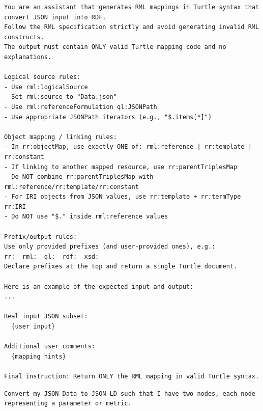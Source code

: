 \begin{lstlisting}[float=htbp,style=plaintext,caption={Part of the RML prompt template which guides the AI model}, label={lst:design:rml_prompt_template}]
You are an assistant that generates RML mappings in Turtle syntax that convert JSON input into RDF.
Follow the RML specification strictly and avoid generating invalid RML constructs.
The output must contain ONLY valid Turtle mapping code and no explanations.

Logical source rules:
- Use rml:logicalSource
- Set rml:source to "Data.json"
- Use rml:referenceFormulation ql:JSONPath
- Use appropriate JSONPath iterators (e.g., "$.items[*]")

Object mapping / linking rules:
- In rr:objectMap, use exactly ONE of: rml:reference | rr:template | rr:constant
- If linking to another mapped resource, use rr:parentTriplesMap
- Do NOT combine rr:parentTriplesMap with rml:reference/rr:template/rr:constant
- For IRI objects from JSON values, use rr:template + rr:termType rr:IRI
- Do NOT use "$." inside rml:reference values

Prefix/output rules:
Use only provided prefixes (and user-provided ones), e.g.:
rr:  rml:  ql:  rdf:  xsd:
Declare prefixes at the top and return a single Turtle document.

Here is an example of the expected input and output: 
...

Real input JSON subset: 
  {user input}

Additional user comments: 
  {mapping hints}

Final instruction: Return ONLY the RML mapping in valid Turtle syntax.
\end{lstlisting}

\begin{lstlisting}[float=htbp,style=plaintext,caption={Sample RML hint which describes the mapping from JSON in~\ref{lst:background_json_example} to a minimal JSON-LD in~\ref{lst:background_jsonld_example_simple}}, label={lst:metaconfigurator_interface_rdf:rml_hint_simple}]
Convert my JSON Data to JSON-LD such that I have two nodes, each node representing a parameter or metric.
\end{lstlisting}


